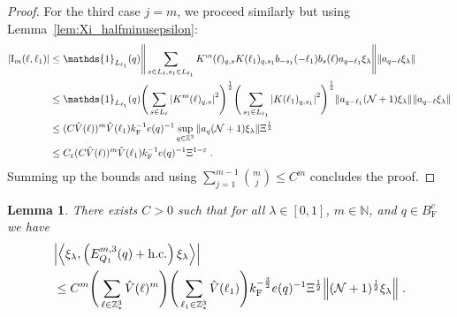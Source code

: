 \documentclass[12pt,a4paper]{article}
\numberwithin{equation}{section}
\newcommand{\cN}{\mathcal{N}}
\newcommand{\NNN}{\mathbb{N}}
\newcommand{\1}{\mathbb{I}}
\newcommand{\F}{\mathrm{F}}
\newcommand{\I}{\mathrm{I}}
\newcommand{\Z}{\mathbb{Z}}
\newcommand{\NN}{\mathcal{N}}
\newcommand{\half}{\frac{1}{2}}
\newcommand{\eva}[1]{\left\langle #1 \right\rangle}
\theoremstyle{plain}
\newtheorem{lemma}[theorem]{Lemma}
\theoremstyle{definition}
\theoremstyle{remark}
\theoremstyle{plain}
\theoremstyle{definition}
\theoremstyle{remark}
\begin{document}
\begin{proof}
For the third case $ j = m $, we proceed similarly but using Lemma~\ref{lem:Xi_halfminusepsilon}:
\begin{align}
	|\I_m(\ell, \ell_1)|
	&\leq \mathds{1}_{L_{\ell_1}}(q)
		\Bigg\Vert \sum_{s\in L_{\ell}, s_1 \in L_{\ell_1}} K^m(\ell)_{q,s}K(\ell_1)_{q,s_1} b_{-s_1}(-\ell_1) b_{s}(\ell) a_{q-\ell_1}\xi_\lambda \Bigg\Vert
		\norm{ a_{q-\ell}\xi_\lambda }\nonumber\\
	&\leq \mathds{1}_{L_{\ell_1}}(q)
		\Bigg(\sum_{s \in L_{\ell}} \abs{K^m(\ell)_{q,s}}^2\Bigg)^\half \Bigg(\sum_{s_1 \in L_{\ell_1}} \abs{K(\ell_1)_{q,s_1}}^2\Bigg)^\half \norm{ a_{q-\ell_1} (\NN+1)\xi_\lambda} \norm{ a_{q-\ell}\xi_\lambda }\nonumber\\
	&\leq (C \hat{V}(\ell))^m \hat{V}(\ell_1) k_{\F}^{-1} e(q)^{-1} \sup_{q \in \Z^3}\norm{ a_{q} (\NN+1) \xi_\lambda}\Xi^\half\nonumber\\
	&\leq C_\varepsilon (C \hat{V}(\ell))^m \hat{V}(\ell_1) k_{\F}^{-1} e(q)^{-1} \Xi^{1-\varepsilon} \;. \label{eq:estEQ1113}
\end{align}
Summing up the bounds and using $\sum_{j=1}^{m-1} {{m}\choose j} \le C^m $
concludes the proof.
\end{proof}



\begin{lemma} \label{lem:EQ112}
There exists $ C > 0 $ such that for all $ \lambda \in [0,1] $, $ m \in \NNN $, and $ q \in B_{\F}^c $ we have
\begin{equation}\label{eq:estEQ112}
\begin{split}
	& \abs{\eva{\xi_\lambda,\left(E^{m,3}_{Q_1}(q) + \mathrm{h.c.}\right) \xi_\lambda }}\\
&	\leq C^m \Bigg(\sum_{\ell\in \Z^3_*} \hat{V}(\ell)^m \Bigg)
		\Bigg(\sum_{\ell_1\in \Z^3_*} \hat{V}(\ell_1) \Bigg)
		k_{\F}^{-\frac{3}{2}} e(q)^{-1} \Xi^{\half}
		\norm{(\NN+1)^\half \xi_\lambda } \;.
\end{split}
\end{equation}
\end{lemma}
\end{document}
